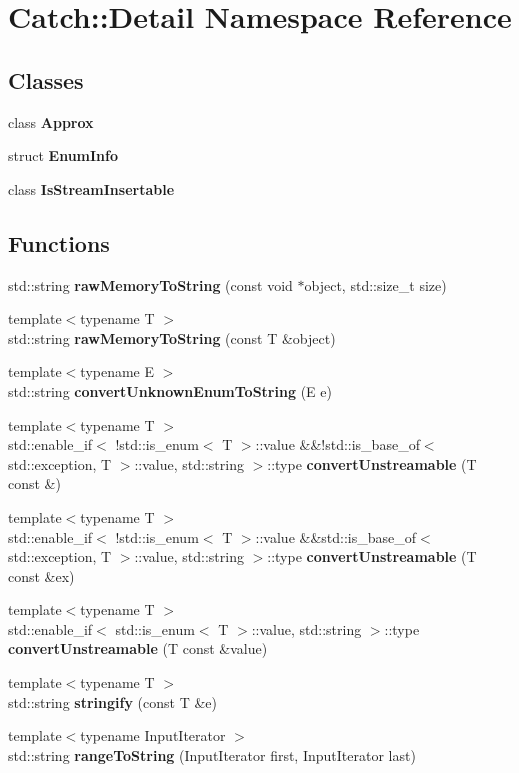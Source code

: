 \section{Catch\+::Detail Namespace Reference}
\label{namespace_catch_1_1_detail}
\subsection*{Classes}
\begin{DoxyCompactItemize}
\item 
class \textbf{ Approx}
\item 
struct \textbf{ Enum\+Info}
\item 
class \textbf{ Is\+Stream\+Insertable}
\end{DoxyCompactItemize}
\subsection*{Functions}
\begin{DoxyCompactItemize}
\item 
std\+::string \textbf{ raw\+Memory\+To\+String} (const void $\ast$object, std\+::size\+\_\+t size)
\item 
{\footnotesize template$<$typename T $>$ }\\std\+::string \textbf{ raw\+Memory\+To\+String} (const T \&object)
\item 
{\footnotesize template$<$typename E $>$ }\\std\+::string \textbf{ convert\+Unknown\+Enum\+To\+String} (E e)
\item 
{\footnotesize template$<$typename T $>$ }\\std\+::enable\+\_\+if$<$ !std\+::is\+\_\+enum$<$ T $>$\+::value \&\&!std\+::is\+\_\+base\+\_\+of$<$ std\+::exception, T $>$\+::value, std\+::string $>$\+::type \textbf{ convert\+Unstreamable} (T const \&)
\item 
{\footnotesize template$<$typename T $>$ }\\std\+::enable\+\_\+if$<$ !std\+::is\+\_\+enum$<$ T $>$\+::value \&\&std\+::is\+\_\+base\+\_\+of$<$ std\+::exception, T $>$\+::value, std\+::string $>$\+::type \textbf{ convert\+Unstreamable} (T const \&ex)
\item 
{\footnotesize template$<$typename T $>$ }\\std\+::enable\+\_\+if$<$ std\+::is\+\_\+enum$<$ T $>$\+::value, std\+::string $>$\+::type \textbf{ convert\+Unstreamable} (T const \&value)
\item 
{\footnotesize template$<$typename T $>$ }\\std\+::string \textbf{ stringify} (const T \&e)
\item 
{\footnotesize template$<$typename Input\+Iterator $>$ }\\std\+::string \textbf{ range\+To\+String} (Input\+Iterator first, Input\+Iterator last)
\end{DoxyCompactItemize}

